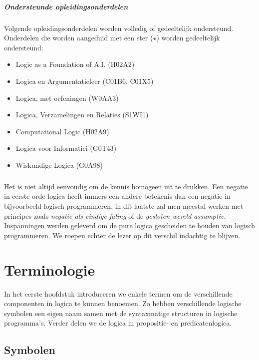 \documentclass[titlepage,a4paper]{book}
\begin{document}
\paragraph{Ondersteunde opleidingsonderdelen} Volgende opleidingsonderdelen worden volledig of gedeeltelijk ondersteund. Onderdelen die worden aangeduid met een ster ($\star$) worden gedeeltelijk ondersteund:
\begin{multicols}{2}
\begin{itemize}
 \item Logic as a Foundation of A.I. (H02A2)
 \item Logica en Argumentatieleer (C01B6, C01X5)
 \item Logica, met oefeningen (W0AA3)
 \item Logica, Verzamelingen en Relaties (S1WI1)
 \item Computational Logic (H02A9)
 \item Logica voor Informatici (G0T43)
 \item Wiskundige Logica (G0A98)
\end{itemize}
\end{multicols}
\paragraph{}
Het is niet altijd eenvoudig om de kennis homogeen uit te drukken. Een negatie in eerste orde logica heeft immers een andere betekenis dan een negatie in bijvoorbeeld logisch programmeren, in dit laatste zal men meestal werken met principes zoals \emph{negatie als eindige faling} of de \emph{gesloten wereld assumptie}. Inspanningen werden geleverd om de pure logica gescheiden te houden van logisch programmeren. We roepen echter de lezer op dit verschil indachtig te blijven.
\mainmatter
\chapter{Terminologie}
In het eerste hoofdstuk introduceren we enkele termen om de verschillende componenten in logica te kunnen benoemen. Zo hebben verschillende logische symbolen een eigen naam samen met de syntaxmatige structuren in logische programma's. Verder delen we de logica in propositie- en predicatenlogica.
\section{Symbolen}
\end{document}
